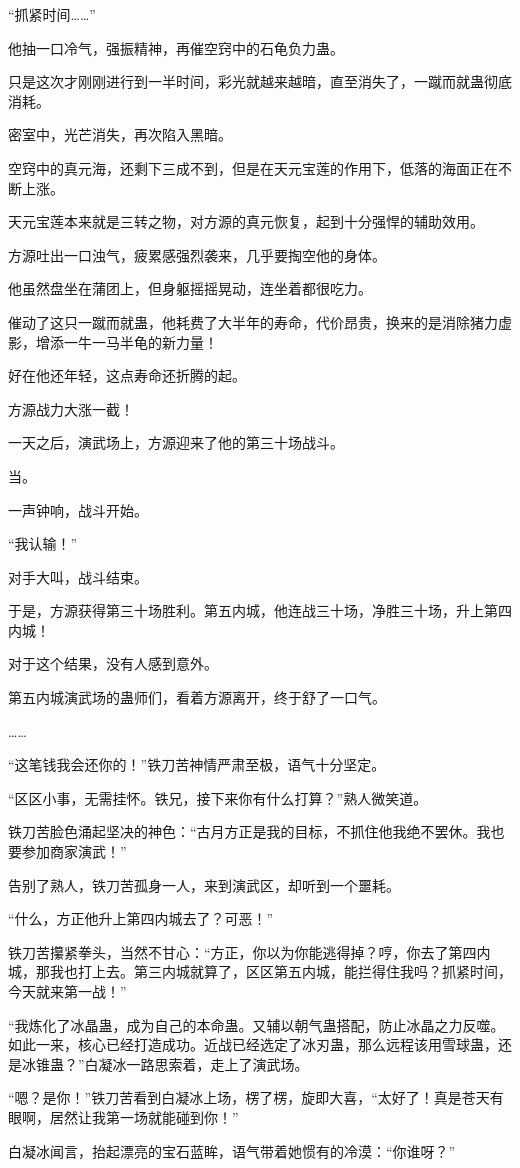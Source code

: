 \begin{this_body}
“抓紧时间……”

他抽一口冷气，强振精神，再催空窍中的石龟负力蛊。

只是这次才刚刚进行到一半时间，彩光就越来越暗，直至消失了，一蹴而就蛊彻底消耗。

密室中，光芒消失，再次陷入黑暗。

空窍中的真元海，还剩下三成不到，但是在天元宝莲的作用下，低落的海面正在不断上涨。

天元宝莲本来就是三转之物，对方源的真元恢复，起到十分强悍的辅助效用。

方源吐出一口浊气，疲累感强烈袭来，几乎要掏空他的身体。

他虽然盘坐在蒲团上，但身躯摇摇晃动，连坐着都很吃力。

催动了这只一蹴而就蛊，他耗费了大半年的寿命，代价昂贵，换来的是消除猪力虚影，增添一牛一马半龟的新力量！

好在他还年轻，这点寿命还折腾的起。

方源战力大涨一截！

一天之后，演武场上，方源迎来了他的第三十场战斗。

当。

一声钟响，战斗开始。

“我认输！”

对手大叫，战斗结束。

于是，方源获得第三十场胜利。第五内城，他连战三十场，净胜三十场，升上第四内城！

对于这个结果，没有人感到意外。

第五内城演武场的蛊师们，看着方源离开，终于舒了一口气。

……

“这笔钱我会还你的！”铁刀苦神情严肃至极，语气十分坚定。

“区区小事，无需挂怀。铁兄，接下来你有什么打算？”熟人微笑道。

铁刀苦脸色涌起坚决的神色：“古月方正是我的目标，不抓住他我绝不罢休。我也要参加商家演武！”

告别了熟人，铁刀苦孤身一人，来到演武区，却听到一个噩耗。

“什么，方正他升上第四内城去了？可恶！”

铁刀苦攥紧拳头，当然不甘心：“方正，你以为你能逃得掉？哼，你去了第四内城，那我也打上去。第三内城就算了，区区第五内城，能拦得住我吗？抓紧时间，今天就来第一战！”

“我炼化了冰晶蛊，成为自己的本命蛊。又辅以朝气蛊搭配，防止冰晶之力反噬。如此一来，核心已经打造成功。近战已经选定了冰刃蛊，那么远程该用雪球蛊，还是冰锥蛊？”白凝冰一路思索着，走上了演武场。

“嗯？是你！”铁刀苦看到白凝冰上场，楞了楞，旋即大喜，“太好了！真是苍天有眼啊，居然让我第一场就能碰到你！”

白凝冰闻言，抬起漂亮的宝石蓝眸，语气带着她惯有的冷漠：“你谁呀？”

\end{this_body}

